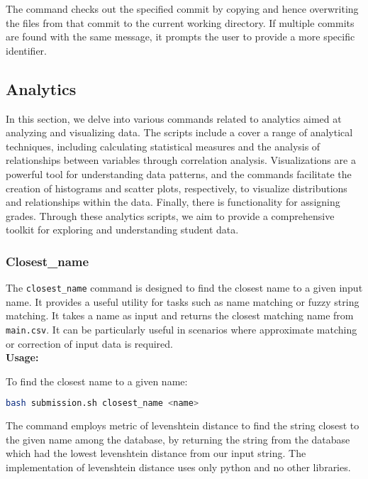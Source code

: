 \documentclass{article}
\begin{document}
The command checks out the specified commit by copying and hence overwriting the files from that commit to the current working directory. If multiple commits are found with the same message, it prompts the user to provide a more specific identifier.

\subsection{Analytics}

In this section, we delve into various commands related to analytics aimed at analyzing and visualizing data. The scripts include a cover a range of analytical techniques, including calculating statistical measures and the analysis of relationships between variables through correlation analysis. Visualizations are a powerful tool for understanding data patterns, and the commands facilitate the creation of histograms and scatter plots, respectively, to visualize distributions and relationships within the data. Finally, there is functionality for assigning grades. Through these analytics scripts, we aim to provide a comprehensive toolkit for exploring and understanding student data.

\subsubsection{Closest\_name}
The \texttt{closest\_name} command is designed to find the closest name to a given input name. It provides a useful utility for tasks such as name matching or fuzzy string matching. It takes a name as input and returns the closest matching name from \texttt{main.csv}. It can be particularly useful in scenarios where approximate matching or correction of input data is required.\\
\textbf{Usage:}
\begin{adjustwidth}{0.5cm}{0cm}
To find the closest name to a given name:
\begin{lstlisting}[language=bash]
bash submission.sh closest_name <name>
\end{lstlisting}
\end{adjustwidth}

The command employs metric of levenshtein distance to find the string closest to the given name among the database, by returning the string from the database which had the lowest levenshtein distance from our input string. The implementation of levenshtein distance uses only python and no other libraries.
\end{document}
